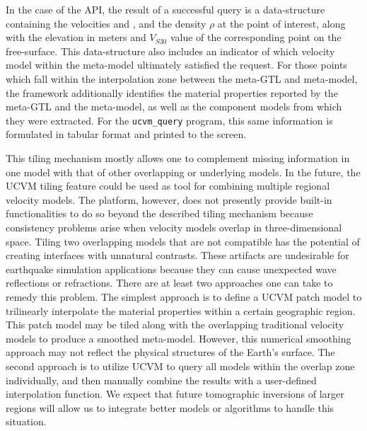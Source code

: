 In the case of the API, the result of a successful query is a data-structure containing the velocities \vp{} and \vs{}, and the density $\rho$ at the point of interest, along with the elevation in meters and $V_{S30}$ value of the corresponding point on the free-surface. This data-structure also includes an indicator of which velocity model within the meta-model ultimately satisfied the request. For those points which fall within the interpolation zone between the meta-GTL and meta-model, the framework additionally identifies the material properties reported by the meta-GTL and the meta-model, as well as the component models from which they were extracted. For the \texttt{ucvm\_query} program, this same information is formulated in tabular format and printed to the screen.

This tiling mechanism mostly allows one to complement missing information in one model with that of other overlapping or underlying models. In the future, the UCVM tiling feature could be used as tool for combining multiple regional velocity models. The platform, however, does not presently provide built-in functionalities to do so beyond the described tiling mechanism because consistency problems arise when velocity models overlap in three-dimensional space. Tiling two overlapping models that are not compatible has the potential of creating interfaces with unnatural contrasts. These artifacts are undesirable for earthquake simulation applications because they can cause unexpected wave reflections or refractions. There are at least two approaches one can take to remedy this problem. The simplest approach is to define a UCVM patch model to trilinearly interpolate the material properties within a certain geographic region. This patch model may be tiled along with the overlapping traditional velocity models to produce a smoothed meta-model. However, this numerical smoothing approach may not reflect the physical structures of the Earth's surface. The second approach is to utilize UCVM to query all models within the overlap zone individually, and then manually combine the results with a user-defined interpolation function. We expect that future tomographic inversions of larger regions will allow us to integrate better models or algorithms to handle this situation.
